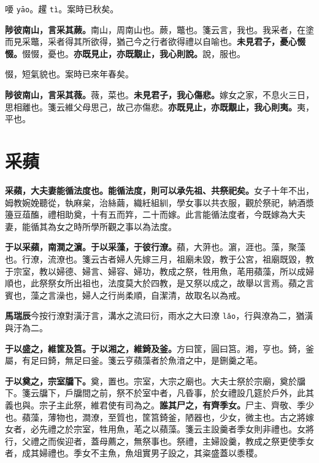 \begin{quoting}喓 \texttt{yāo}。趯 \texttt{tì}。案時已秋矣。\end{quoting}

\textbf{陟彼南山，言采其蕨。}{\footnotesize 南山，周南山也。蕨，鼈也。箋云言，我也。我采者，在塗而見采鼈，采者得其所欲得，猶己今之行者欲得禮以自喻也。}\textbf{未見君子，憂心惙惙。}{\footnotesize 惙惙，憂也。}\textbf{亦既見止，亦既覯止，我心則說。}{\footnotesize 說，服也。}

\begin{quoting}惙，短氣貌也。案時已來年春矣。\end{quoting}

\textbf{陟彼南山，言采其薇。}{\footnotesize 薇，菜也。}\textbf{未見君子，我心傷悲。}{\footnotesize 嫁女之家，不息火三日，思相離也。箋云維父母思己，故己亦傷悲。}\textbf{亦既見止，亦既覯止，我心則夷。}{\footnotesize 夷，平也。}

\section{采蘋}


\textbf{采蘋，大夫妻能循法度也。能循法度，則可以承先祖、共祭祀矣。}{\footnotesize 女子十年不出，姆教婉娩聽從，執麻枲，治絲繭，織紝組紃，學女事以共衣服，觀於祭祀，納酒漿籩豆葅醢，禮相助奠，十有五而筓，二十而嫁。此言能循法度者，今既嫁為大夫妻，能循其為女之時所學所觀之事以為法度。}

\textbf{于以采蘋，南澗之濵。于以采藻，于彼行潦。}{\footnotesize 蘋，大蓱也。濵，涯也。藻，聚藻也。行潦，流潦也。箋云古者婦人先嫁三月，祖廟未毀，教于公宮，祖廟既毀，教于宗室，教以婦德、婦言、婦容、婦功，教成之祭，牲用魚，芼用蘋藻，所以成婦順也，此祭祭女所出祖也，法度莫大於四教，是又祭以成之，故舉以言焉。蘋之言賓也，藻之言澡也，婦人之行尚柔順，自潔清，故取名以為戒。}

\begin{quoting}\textbf{馬瑞辰}今按行潦對潢汙言，溝水之流曰衍，雨水之大曰潦 \texttt{lǎo}，行與潦為二，猶潢與汙為二。\end{quoting}

\textbf{于以盛之，維筐及筥。于以湘之，維錡及釜。}{\footnotesize 方曰筐，圓曰筥。湘，亨也。錡，釜屬，有足曰錡，無足曰釜。箋云亨蘋藻者於魚湆之中，是鉶羹之芼。}

\textbf{于以奠之，宗室牖下。}{\footnotesize 奠，置也。宗室，大宗之廟也。大夫士祭於宗廟，奠於牖下。箋云牖下，戶牖間之前，祭不於室中者，凡昏事，於女禮設几筵於戶外，此其義也與。宗子主此祭，維君使有司為之。}\textbf{誰其尸之，有齊季女。}{\footnotesize 尸主、齊敬、季少也。蘋藻，薄物也，澗潦，至質也，筐筥錡釜，陋器也，少女，微主也。古之將嫁女者，必先禮之於宗室，牲用魚，芼之以蘋藻。箋云主設羹者季女則非禮也。女將行，父禮之而俟迎者，蓋母薦之，無祭事也。祭禮，主婦設羹，教成之祭更使季女者，成其婦禮也。季女不主魚，魚俎實男子設之，其粢盛蓋以黍稷。}

